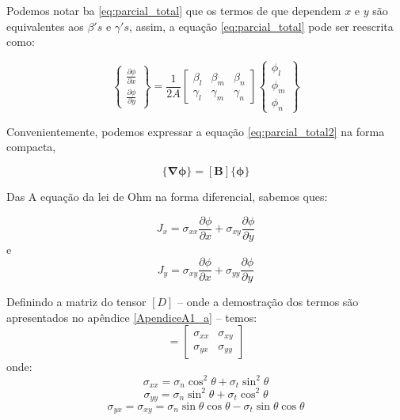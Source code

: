 \documentclass[
12pt,
a4paper,
oneside,
chapter=TITLE,
sumario=tradicional
]{abntex2}
\begin{document}
    
    Podemos notar ba \ref{eq:parcial_total} que os termos de que dependem $x$ e  $y$ são equivalentes  aos $\beta 's$ e $\gamma 's$, assim, a equação \ref{eq:parcial_total} pode ser reescrita como:
    
    \begin{equation}
    	\begin{Bmatrix} \frac{\partial \phi}{\partial x}\\\frac{\partial \phi}{\partial y}\end{Bmatrix} =
    	\frac{1}{2A} 
    	\begin{bmatrix} \beta_l & \beta_m& \beta_n\\ 
    		\gamma_l& \gamma_m& \gamma_n \end{bmatrix}
    	\begin{Bmatrix} \phi_l\\ \phi_m\\ \phi_n\end{Bmatrix}
    	\label{eq:parcial_total2}
    \end{equation}
    
    Convenientemente,  podemos expressar a equação \ref*{eq:parcial_total2} na forma compacta, 
    
    \begin{equation}
    	\{ \bm{\nabla\phi} \} = [ \bm{B} ] \{ \bm{\phi} \}
    	\label{eq:parcial_compacta}
    \end{equation}
    
    Das A equação da lei de Ohm na forma diferencial, sabemos ques:
    
    \begin{equation}
    	J_x = \sigma_{xx}\frac{\partial \phi}{\partial x}  
    	+  
    	\sigma_{xy}\frac{\partial \phi}{\partial y}  
    	\label{eq:c_calor_x}
    \end{equation}
    e
    \begin{equation}
    	J_y = \sigma_{xy}\frac{\partial \phi}{\partial x}  
    	+  
    	\sigma_{yy}\frac{\partial \phi}{\partial y}
    	\label{eq:c_calor_y}
    \end{equation}
    
    Definindo a matriz do tensor $[D]$ -- onde a demostração dos termos  são apresentados no apêndice \ref{ApendiceA1_a} -- temos:   
 \begin{equation}
    	[D] =
    	\begin{bmatrix} \sigma_{xx} & \sigma_{xy}\\ 
    		\sigma_{yx}& \sigma_{yy} \end{bmatrix}
    	\label{eq:matriz_D}
 \end{equation}       
    onde:  
\begin{equation*}
    \sigma_{xx} = \sigma_n \cos^2 \theta + \sigma_t \sin^2 \theta 
\end{equation*} 
\begin{equation*}
    \sigma_{yy} = \sigma_n \sin^2 \theta + \sigma_t \cos^2 \theta 
\end{equation*}   
\begin{equation*}
    \sigma_{yx} = \sigma_{xy} = \sigma_n \sin \theta \cos \theta - \sigma_t \sin \theta \cos \theta 
\end{equation*}
\end{document}
